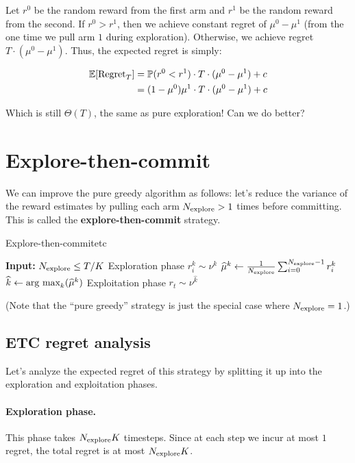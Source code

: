 \documentclass[\main/main]{subfiles}
\begin{document}
Let $r^0$ be the random reward from the first arm and $r^1$ be the random reward from the second. If $r^0 > r^1$, then we achieve constant regret of $\mu^0 - \mu^1$ (from the one time we pull arm $1$ during exploration). Otherwise, we achieve regret $T\cdot (\mu^0 - \mu^1)$. Thus, the expected regret is simply:

\begin{align*}
    \operatorname*{\mathbb{E}}[\text{Regret}_T] & = \operatorname*{\mathbb{P}}(r^0 < r^1) \cdot T \cdot (\mu^0 - \mu^1) + c     \\
                        & = (1 - \mu^0) \mu^1 \cdot T \cdot (\mu^0 - \mu^1) + c
\end{align*}

Which is still $\Theta(T)$, the same as pure exploration! Can we do better?

\section{Explore-then-commit}

We can improve the pure greedy algorithm as follows:
let's reduce the variance of the reward estimates by pulling each arm $N_{\text{explore}} > 1$ times before committing. This is called the \textbf{explore-then-commit} strategy.
\begin{definition}{Explore-then-commit}{etc}
    \begin{algorithmic}
        \State \textbf{Input:} $N_{\text{explore}} \le T/K$
        \Comment Exploration phase
        \State $r^k_i \sim \nu^k$
        \EndFor
        \State $\widehat \mu^k \gets \frac{1}{N_{\text{explore}}} \sum_{i=0}^{N_{\text{explore}}-1} r^k_i$
        \EndFor
        \State $\widehat k \gets \operatorname*{\textrm{arg\ max}}_k (\widehat \mu^k)$
        \Comment Exploitation phase
        \State $r_t \sim \nu^{\hat k}$
        \EndFor
    \end{algorithmic}
\end{definition}
(Note that the ``pure greedy'' strategy is just the special case where $N_{\text{explore}} = 1$.)

\subsection{ETC regret analysis} \label{sec:etc-regret-analysis}

Let's analyze the expected regret of this strategy by splitting it up into the exploration and exploitation phases.

\paragraph*{Exploration phase.} This phase takes $N_{\text{explore}} K$ timesteps. Since at each step we incur at most $1$ regret, the total regret is at most $N_{\text{explore}} K$.
\end{document}
